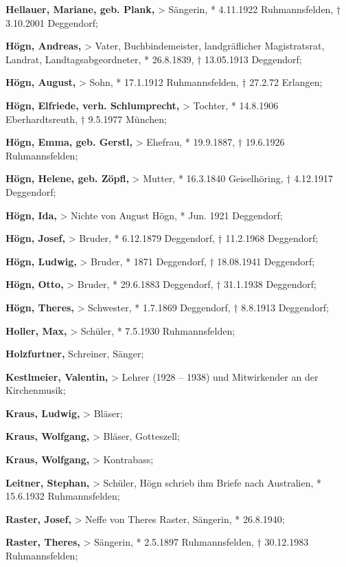 \documentclass[a4paper]{article}
\begin{document}
\textbf{Hellauer, Mariane, geb. Plank,} {\textgreater} Sängerin, *
4.11.1922 Ruhmannsfelden, † 3.10.2001 Deggendorf;

\textbf{Högn, Andreas,} {\textgreater} Vater, Buchbindemeister,
landgräflicher Magistratsrat, Landrat, Landtagsabgeordneter, *
26.8.1839, † 13.05.1913 Deggendorf;

\textbf{Högn, August,} {\textgreater} Sohn, * 17.1.1912 Ruhmannsfelden,
† 27.2.72 Erlangen;

\textbf{Högn, Elfriede, verh. Schlumprecht, }{\textgreater} Tochter, *
14.8.1906 Eberhardtsreuth, † 9.5.1977 München;

\textbf{Högn, Emma, geb. Gerstl,} {\textgreater} Ehefrau, * 19.9.1887, †
19.6.1926 Ruhmannsfelden;

\textbf{Högn, Helene, geb. Zöpfl,} {\textgreater} Mutter, * 16.3.1840
Geiselhöring, † 4.12.1917 Deggendorf;

\textbf{Högn, Ida,} {\textgreater} Nichte von August Högn, * Jun. 1921
Deggendorf;

\textbf{Högn, Josef,} {\textgreater} Bruder, * 6.12.1879 Deggendorf, †
11.2.1968 Deggendorf;

\textbf{Högn, Ludwig, }{\textgreater} Bruder,\textbf{ }* 1871
Deggendorf, † 18.08.1941 Deggendorf;

\textbf{Högn, Otto,} {\textgreater} Bruder, * 29.6.1883 Deggendorf, †
31.1.1938 Deggendorf;

\textbf{Högn, Theres,} {\textgreater} Schwester, * 1.7.1869 Deggendorf,
† 8.8.1913 Deggendorf;

\textbf{Holler, Max,} {\textgreater} Schüler, * 7.5.1930 Ruhmannsfelden;

\textbf{Holzfurtner,} Schreiner, Sänger;

\textbf{Kestlmeier, Valentin,} {\textgreater} Lehrer (1928 – 1938) und
Mitwirkender an der Kirchenmusik;

\textbf{Kraus, Ludwig,} {\textgreater} Bläser;

\textbf{Kraus, Wolfgang,} {\textgreater} Bläser, Gotteszell;

\textbf{Kraus, Wolfgang,} {\textgreater} Kontrabass;

\textbf{Leitner, Stephan,} {\textgreater} Schüler, Högn schrieb ihm
Briefe nach Australien, * 15.6.1932 Ruhmannsfelden;

\textbf{Raster, Josef,} {\textgreater} Neffe von Theres Raster,
Sängerin, * 26.8.1940;

\textbf{Raster, Theres,} {\textgreater} Sängerin, * 2.5.1897
Ruhmannsfelden, † 30.12.1983 Ruhmannsfelden;
\end{document}
